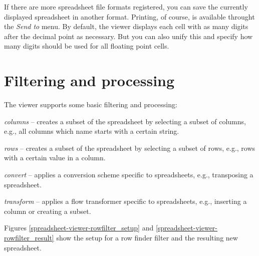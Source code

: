 \documentclass[a4paper]{book}
\begin{document}
If there are more spreadsheet file formats registered, you can save the
currently displayed spreadsheet in another format. Printing, of course, is
available throught the \textit{Send to} menu. By default, the viewer displays
each cell with as many digits after the decimal point as necessary. But you can
also unify this and specify how many digits should be used for all floating
point cells.

\clearpage
\section{Filtering and processing}
The viewer supports some basic filtering and processing:
\begin{tight_itemize}
	\item \textit{columns} -- creates a subset of the spreadsheet by selecting
	a subset of columns, e.g., all columns which name starts with a certain string.
	\item \textit{rows} -- creates a subset of the spreadsheet by selecting
	a subset of rows, e.g., rows with a certain value in a column.
	\item \textit{convert} -- applies a conversion scheme specific to 
	spreadsheets, e.g., transposing a spreadsheet.
	\item \textit{transform} -- applies a flow transformer specific to 
	spreadsheets, e.g., inserting a column or creating a subset.
\end{tight_itemize}
Figures \ref{spreadsheet-viewer-rowfilter_setup} and \ref{spreadsheet-viewer-rowfilter_result}
show the setup for a row finder filter and the resulting new spreadsheet.
\end{document}
